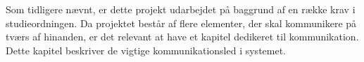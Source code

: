 Som tidligere nævnt, er dette projekt udarbejdet på baggrund af en række krav i studieordningen.
Da projektet består af flere elementer, der skal kommunikere på tværs af hinanden, er det relevant at have et kapitel dedikeret til kommunikation.
Dette kapitel beskriver de vigtige kommunikationsled i systemet.